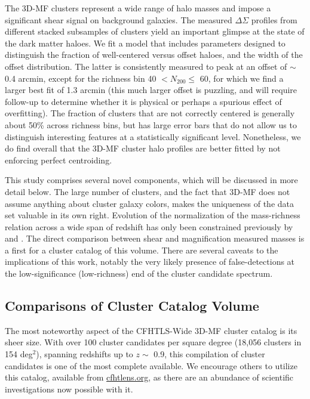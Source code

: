 The \ac{3D-MF} clusters represent a wide range of halo masses and impose a significant shear signal on background galaxies. The measured $\Delta \Sigma$ profiles from different stacked subsamples of clusters yield an important glimpse at the state of the dark matter haloes. We fit a model that includes parameters designed to distinguish the fraction of well-centered versus offset haloes, and the width of the offset distribution. The latter is consistently measured to peak at an offset of $\sim$ 0.4 arcmin, except for the richness bin 40 $< N_{200} \leq$ 60, for which we find a larger best fit of 1.3 arcmin (this much larger offset is puzzling, and will require follow-up to determine whether it is physical or perhaps a spurious effect of overfitting). The fraction of clusters that are not correctly centered is generally about 50\% across richness bins, but has large error bars that do not allow us to distinguish interesting features at a statistically significant level. Nonetheless, we do find overall that the \ac{3D-MF} cluster halo profiles are better fitted by not enforcing perfect centroiding.

This study comprises several novel components, which will be discussed in more detail below. The large number of clusters, and the fact that \ac{3D-MF} does not assume anything about cluster galaxy colors, makes the uniqueness of the data set valuable in its own right.  Evolution of the normalization of the mass-richness relation across a wide span of redshift has only been constrained previously by \citet{EdoThesis12} and \citet{Andreon14}. The direct comparison between shear and magnification measured masses is a first for a cluster catalog of this volume. There are several caveats to the implications of this work, notably the very likely presence of false-detections at the low-significance (low-richness) end of the cluster candidate spectrum.



\subsection{Comparisons of Cluster Catalog Volume}

The most noteworthy aspect of the \ac{CFHTLS}-Wide \ac{3D-MF} cluster catalog is its sheer size. With over 100 cluster candidates per square degree (18,056 clusters in 154 deg$^2$), spanning redshifts up to $z \sim$ 0.9, this compilation of cluster candidates is one of the most complete available. We encourage others to utilize this catalog, available from \url{cfhtlens.org}, as there are an abundance of scientific investigations now possible with it. 


